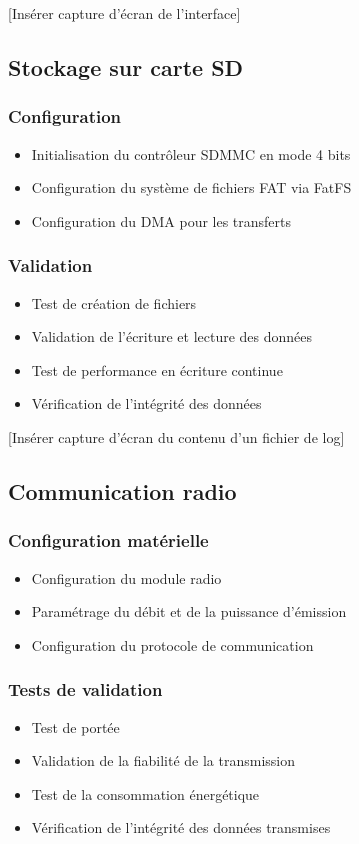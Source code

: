\documentclass[12pt]{article}
\begin{document}
[Insérer capture d'écran de l'interface]

\subsection{Stockage sur carte SD}
\subsubsection{Configuration}
\begin{itemize}
    \item Initialisation du contrôleur SDMMC en mode 4 bits
    \item Configuration du système de fichiers FAT via FatFS
    \item Configuration du DMA pour les transferts
\end{itemize}

\subsubsection{Validation}
\begin{itemize}
    \item Test de création de fichiers
    \item Validation de l'écriture et lecture des données
    \item Test de performance en écriture continue
    \item Vérification de l'intégrité des données
\end{itemize}

[Insérer capture d'écran du contenu d'un fichier de log]

\subsection{Communication radio}
\subsubsection{Configuration matérielle}
\begin{itemize}
    \item Configuration du module radio 
    \item Paramétrage du débit et de la puissance d'émission
    \item Configuration du protocole de communication
\end{itemize}

\subsubsection{Tests de validation}
\begin{itemize}
    \item Test de portée
    \item Validation de la fiabilité de la transmission
    \item Test de la consommation énergétique
    \item Vérification de l'intégrité des données transmises
\end{itemize}
\end{document}

